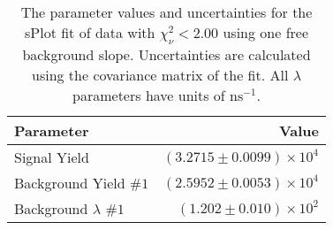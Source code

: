 
\begin{table}[ht]
    \begin{center}
        \begin{tabular}{lr}\toprule
            Parameter & Value \\\midrule
            Signal Yield & $(3.2715 \pm 0.0099) \times 10^{4}$ \\
            Background Yield $\#1$ & $(2.5952 \pm 0.0053) \times 10^{4}$ \\
            Background $\lambda$ $\#1$ & $(1.202 \pm 0.010) \times 10^{2}$ \\\bottomrule
        \end{tabular}
        \caption{The parameter values and uncertainties for the sPlot fit of data with $\chi^2_\nu < 2.00$ using one free background slope. Uncertainties are calculated using the covariance matrix of the fit. All $\lambda$ parameters have units of $\si{\nano\second}^{-1}$.}\label{tab:splot-fit-results-chisqdof-2.00-free-1}
    \end{center}
\end{table}

